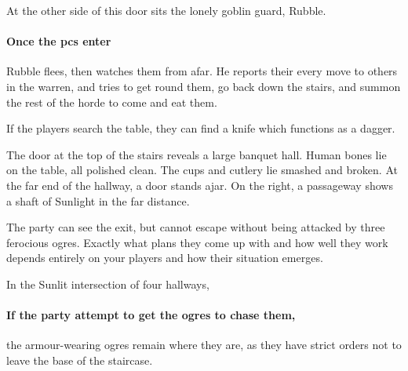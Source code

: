 \begin{multicols}{2}



At the other side of this door sits the lonely goblin guard, Rubble.

\paragraph{Once the \glspl{pc} enter}
Rubble flees, then watches them from afar.
He reports their every move to others in the \gls{warren}, and tries to get round them, go back down the stairs, and summon the rest of the horde to come and eat them.



If the players search the table,
they can find a knife which functions as a dagger.

\begin{boxtext}
  The door at the top of the stairs reveals a large banquet hall.
  Human bones lie on the table, all polished clean.
  The cups and cutlery lie smashed and broken.
  At the far end of the hallway, a door stands ajar.
  On the right, a passageway shows a shaft of Sunlight in the far distance.
\end{boxtext}


The party can see the exit, but cannot escape without being attacked by three ferocious ogres.
Exactly what plans they come up with and how well they work depends entirely on your players and how their situation emerges.

\begin{boxtext}
  In the Sunlit intersection of four hallways,
  \iftoggle{hardcore}%
    {four ogres sit playing a game of dice.  Two are clad in black leather armour, with a massive sword by their side.
    Another sucks on a horse's uncooked head, while the third goes for a piss behind the staircase.}%
    {three ogres sit playing dice.
    Two are clad in black, leather armour, apparently pieced together from multiple suits.
    The third sits watching them play some dice game.}%
\end{boxtext}

\paragraph{If the party attempt to get the ogres to chase them,}
the armour-wearing ogres remain where they are, as they have strict orders not to leave the base of the staircase.


\end{multicols}
